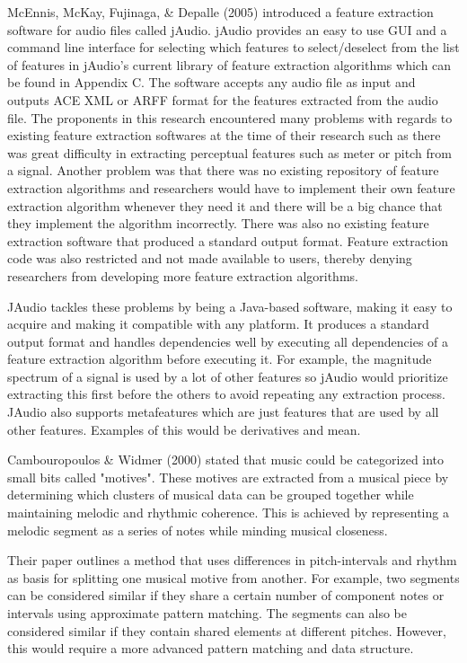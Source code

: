 	McEnnis, McKay, Fujinaga, \& Depalle (2005) introduced a feature extraction software for audio files called jAudio. jAudio provides an easy to use GUI and a command line interface for selecting which features to select/deselect from the list of features in jAudio's current library of feature extraction algorithms which can be found in Appendix C. The software accepts any audio file as input and outputs ACE XML or ARFF format for the features extracted from the audio file. The proponents in this research encountered many problems with regards to existing feature extraction softwares at the time of their research such as there was great difficulty in extracting perceptual features such as meter or pitch from a signal. Another problem was that there was no existing repository of feature extraction algorithms and researchers would have to implement their own feature extraction algorithm whenever they need it and there will be a big chance that they implement the algorithm incorrectly. There was also no existing feature extraction software that produced a standard output format. Feature extraction code was also restricted and not made available to users, thereby denying researchers from developing more feature extraction algorithms.

	JAudio tackles these problems by being a Java-based software, making it easy to acquire and making it compatible with any platform. It produces a standard output format and handles dependencies well by executing all dependencies of a feature extraction algorithm before executing it. For example, the magnitude spectrum of a signal is used by a lot of other features so jAudio would prioritize extracting this first before the others to avoid repeating any extraction process. JAudio also supports metafeatures which are just features that are used by all other features. Examples of this would be derivatives and mean.

Cambouropoulos \& Widmer (2000) stated that music could be categorized into small bits called "motives". These motives are extracted from a musical piece by determining which clusters of musical data can be grouped together while maintaining melodic and rhythmic coherence. This is achieved by representing a melodic segment as a series of notes while minding musical closeness. 

Their paper outlines a method that uses differences in pitch-intervals and rhythm as basis for splitting one musical motive from another. For example, two segments can be considered similar if they share a certain number of component notes or intervals using approximate pattern matching. The segments can also be considered similar if they contain shared elements at different pitches. However, this would require a more advanced pattern matching and data structure.


